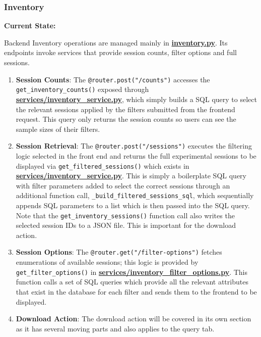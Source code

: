 \documentclass{article}
\begin{document}
\subsubsection{Inventory}

\par{\textbf{Current State:}}
\par{Backend Inventory operations are managed mainly in \href{https://github.com/OCD-Rats-Capstone/OCD-Rat-Infrastructure/blob/main/src/ocd-rat-backend/routers/inventory.py}{\textbf{inventory.py}}. Its endpoints invoke services that provide session counts, filter options and full sessions.}

\begin{enumerate}

  \item{\textbf{Session Counts}: The \texttt{@router.post("/counts")} accesses the \texttt{get\_inventory\_counts()} exposed through \href{https://github.com/OCD-Rats-Capstone/OCD-Rat-Infrastructure/blob/main/src/ocd-rat-backend/services/inventory_service.py}{\textbf{services/inventory\_service.py}}, which simply builds a SQL query to select the relevant sessions applied by the filters submitted from the frontend request. This query only returns the session counts so users can see the sample sizes of their filters. }
  \item{\textbf{Session Retrieval}: The \texttt{@router.post("/sessions")} executes the filtering logic selected in the front end and returns the full experimental sessions to be displayed via \texttt{get\_filtered\_sessions()} which exists in \href{https://github.com/OCD-Rats-Capstone/OCD-Rat-Infrastructure/blob/main/src/ocd-rat-backend/services/inventory_service.py}{\textbf{services/inventory\_service.py}}. This is simply a boilerplate SQL query with filter parameters added to select the correct sessions through an additional function call, \texttt{\_build\_filtered\_sessions\_sql}, which sequentially appends SQL parameters to a list which is then passed into the SQL query.
  Note that the \texttt{get\_inventory\_sessions()} function call also writes the selected session IDs to a JSON file. This is important for the download action.}
  \item{\textbf{Session Options}: The \texttt{@router.get("/filter-options")} fetches enumerations of available sessions; this logic is provided by \texttt{get\_filter\_options()} in \href{https://github.com/OCD-Rats-Capstone/OCD-Rat-Infrastructure/blob/main/src/ocd-rat-backend/services/inventory_filter_options.py}{\textbf{services/inventory\_filter\_options.py}}. This function calls a set of SQL queries which provide all the relevant attributes that exist in the database for each filter and sends them to the frontend to be displayed.}
  \item{\textbf{Download Action}: The download action will be covered in its own section as it has several moving parts and also applies to the query tab.}
\end{enumerate}
\end{document}
